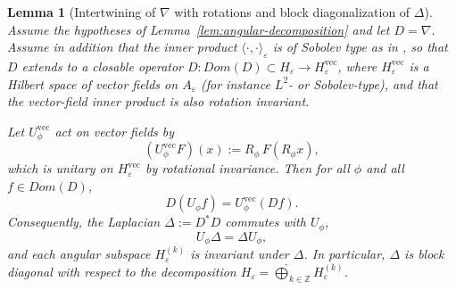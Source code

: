 \documentclass{amsart}
\numberwithin{equation}{section}
\newtheorem{lemma}[theorem]{Lemma}
\theoremstyle{definition}
\theoremstyle{remark}
\begin{document}
\begin{lemma}[Intertwining of $\nabla$ with rotations and block diagonalization of $\Delta$]
\label{lem:grad-intertwining}
Assume the hypotheses of Lemma~\ref{lem:angular-decomposition} and let $D=\nabla$.
Assume in addition that the inner product $\langle\cdot,\cdot \rangle_{\varepsilon}$ is of Sobolev type
as in \cite{MagnotThinAnnuli}, so that $D$ extends to a closable operator
$D:Dom(D)\subset H_\varepsilon\to H_\varepsilon^{\mathrm{vec}}$, where $H_\varepsilon^{\mathrm{vec}}$
is a Hilbert space of vector fields on $A_\varepsilon$ (for instance $L^2$- or Sobolev-type),
and that the vector-field inner product is also rotation invariant.

Let $U_\phi^{\mathrm{vec}}$ act on vector fields by
\[
(U_\phi^{\mathrm{vec}}F)(x) := R_\phi\,F(R_\phi x),
\]
which is unitary on $H_\varepsilon^{\mathrm{vec}}$ by rotational invariance.
Then for all $\phi$ and all $f\in Dom(D)$,
\begin{equation}\label{eq:intertwine}
D(U_\phi f) = U_\phi^{\mathrm{vec}}(Df).
\end{equation}
Consequently, the Laplacian $\Delta:=D^*D$ commutes with $U_\phi$,
\begin{equation}\label{eq:Delta-commute}
U_\phi \Delta = \Delta U_\phi,
\end{equation}
and each angular subspace $H_\varepsilon^{(k)}$ is invariant under $\Delta$.
In particular, $\Delta$ is block diagonal with respect to the decomposition
$H_\varepsilon=\widehat\bigoplus_{k\in\mathbb Z}H_\varepsilon^{(k)}$.
\end{lemma}
\end{document}
